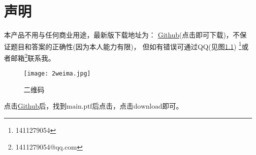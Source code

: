 \chapter{声明}
本产品不用与任何商业用途，最新版下载地址为：
\href{https://github.com/1411279054/Letax-learning-Note/tree/master/%E6%95%B0%E5%AD%A6%E5%88%86%E6%9E%90%E8%A7%A3%E9%A2%98%E6%8C%87%E5%8D%97%E8%AF%BE%E5%90%8E%E4%B9%A0%E9%A2%98%E9%87%8D%E6%8E%92}{Github}(点击即可下载)，不保证题目和答案的正确性(因为本人能力有限)，
但如有错误可通过QQ(见图\ref{fig:1}) \footnote{1411279054}或者邮箱\footnote{1411279054@qq.com}联系我。
\begin{figure}[htbp]
	\centering
	\texttt{[image: 2weima.jpg]}
	\caption{二维码}\label{fig:1}
\end{figure}

点击\href{https://github.com/1411279054/Letax-learning-Note/tree/master/%E6%95%B0%E5%AD%A6%E5%88%86%E6%9E%90%E8%A7%A3%E9%A2%98%E6%8C%87%E5%8D%97%E8%AF%BE%E5%90%8E%E4%B9%A0%E9%A2%98%E9%87%8D%E6%8E%92}{Github}后，找到$\mathrm{main.ptf}$后点击，点击$\mathrm{download}$即可。